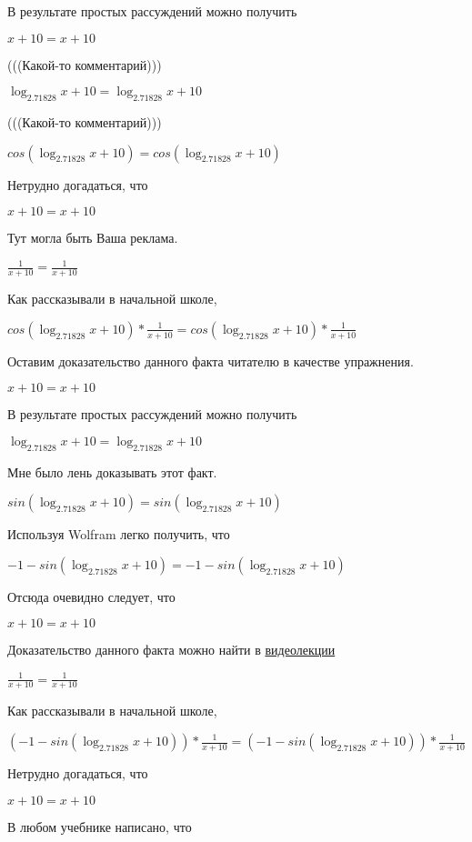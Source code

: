\documentclass[12pt,a4paper,fleqn]{article}
\theoremstyle{definition}
\begin{document}
В результате простых рассуждений можно получить

$ x  +  10  =  x  +  10 $

(((Какой-то комментарий)))

$\log_{ 2.71828 }{ x  +  10 } = \log_{ 2.71828 }{ x  +  10 }$

(((Какой-то комментарий)))

$cos(\log_{ 2.71828 }{ x  +  10 }) = cos(\log_{ 2.71828 }{ x  +  10 })$

Нетрудно догадаться, что

$ x  +  10  =  x  +  10 $

Тут могла быть Ваша реклама.

$\frac{ 1 }{ x  +  10 }
 = \frac{ 1 }{ x  +  10 }
$

Как рассказывали в начальной школе,

$cos(\log_{ 2.71828 }{ x  +  10 }) * \frac{ 1 }{ x  +  10 }
 = cos(\log_{ 2.71828 }{ x  +  10 }) * \frac{ 1 }{ x  +  10 }
$

Оставим доказательство данного факта читателю в качестве упражнения.

$ x  +  10  =  x  +  10 $

В результате простых рассуждений можно получить

$\log_{ 2.71828 }{ x  +  10 } = \log_{ 2.71828 }{ x  +  10 }$

Мне было лень доказывать этот факт.

$sin(\log_{ 2.71828 }{ x  +  10 }) = sin(\log_{ 2.71828 }{ x  +  10 })$

Используя Wolfram легко получить, что

$ -1  - sin(\log_{ 2.71828 }{ x  +  10 }) =  -1  - sin(\log_{ 2.71828 }{ x  +  10 })$

Отсюда очевидно следует, что

$ x  +  10  =  x  +  10 $

Доказательство данного факта можно найти в \href{https://www.youtube.com/watch?v=dQw4w9WgXcQ}{видеолекции}

$\frac{ 1 }{ x  +  10 }
 = \frac{ 1 }{ x  +  10 }
$

Как рассказывали в начальной школе,

$( -1  - sin(\log_{ 2.71828 }{ x  +  10 })) * \frac{ 1 }{ x  +  10 }
 = ( -1  - sin(\log_{ 2.71828 }{ x  +  10 })) * \frac{ 1 }{ x  +  10 }
$

Нетрудно догадаться, что

$ x  +  10  =  x  +  10 $

В любом учебнике написано, что
\end{document}

